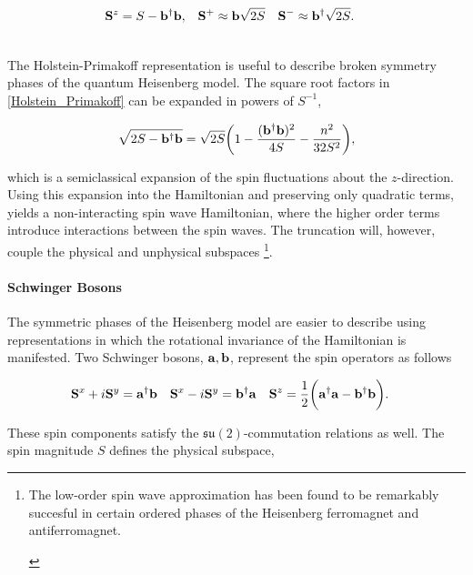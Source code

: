 \documentclass{homework}
\begin{document}
\begin{align}
    {\bf S}^z &= S - {\bf b}^\dagger {\bf b}, & {\bf S}^+ &\approx {\bf b} \sqrt{2S} & {\bf S}^- &\approx {\bf b}^\dagger \sqrt{2S}.
\end{align}

\blanky \\

The Holstein-Primakoff representation is useful to describe broken symmetry phases of the quantum Heisenberg model. The square root factors in \cref{Holstein_Primakoff} can be expanded in powers of $S^{-1}$,

$$
    \sqrt{2 S - {\bf b}^\dagger {\bf b}} = \sqrt{2S} \bigg(1 - \frac{({\bf b}^\dagger {\bf b})^2}{4S} - \frac{n^2}{32 S^2}\bigg),
$$

which is a semiclassical expansion of the spin fluctuations about the $z$-direction. Using this expansion into the Hamiltonian and preserving only quadratic terms, yields a non-interacting spin wave Hamiltonian, where the higher order terms introduce interactions between the spin waves. The truncation will, however, couple the physical and unphysical subspaces \footnote{

\begin{tcolorbox}[colback=my-blue, 
title = Physical Context]

The low-order spin wave approximation has been found to be remarkably succesful in certain ordered phases of the Heisenberg ferromagnet and antiferromagnet. 

\end{tcolorbox}

}. \\

\paragraph{\textbf{Schwinger Bosons}}

The symmetric phases of the Heisenberg model are easier to describe using representations in which the rotational invariance of the Hamiltonian is manifested. Two Schwinger bosons, ${\bf a}, {\bf b}$, represent the spin operators as follows 

\begin{align}
    {\bf S}^x + i {\bf S}^y &= {\bf a}^\dagger {\bf b} & 
    {\bf S}^x - i {\bf S}^y &= {\bf b}^\dagger {\bf a} & {\bf S}^z &= \frac{1}{2} \bigg({\bf a}^\dagger {\bf a} - {\bf b}^\dagger {\bf b}\bigg).
\end{align}

These spin components satisfy the $\mathfrak{s}\mathfrak{u}(2)$-commutation relations as well. The spin magnitude $S$ defines the physical subspace, 
\end{document}
